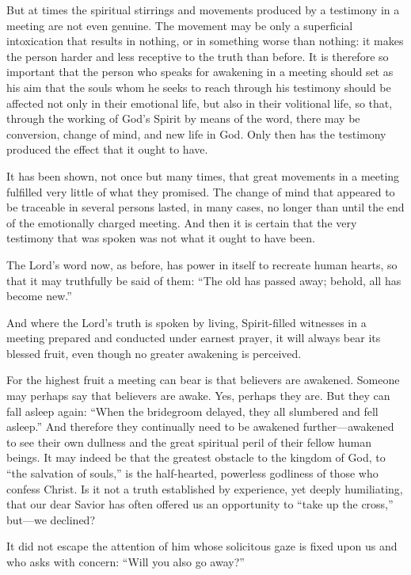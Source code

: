 But at times the spiritual stirrings and movements produced by a testimony in a meeting are not even genuine. The movement may be only a superficial intoxication that results in nothing, or in something worse than nothing: it makes the person harder and less receptive to the truth than before. It is therefore so important that the person who speaks for awakening in a meeting should set as his aim that the souls whom he seeks to reach through his testimony should be affected not only in their emotional life, but also in their volitional life, so that, through the working of God’s Spirit by means of the word, there may be conversion, change of mind, and new life in God. Only then has the testimony produced the effect that it ought to have.

It has been shown, not once but many times, that great movements in a meeting fulfilled very little of what they promised. The change of mind that appeared to be traceable in several persons lasted, in many cases, no longer than until the end of the emotionally charged meeting. And then it is certain that the very testimony that was spoken was not what it ought to have been.

The Lord’s word now, as before, has power in itself to recreate human hearts, so that it may truthfully be said of them: “The old has passed away; behold, all has become new.”

And where the Lord’s truth is spoken by living, Spirit-filled witnesses in a meeting prepared and conducted under earnest prayer, it will always bear its blessed fruit, even though no greater awakening is perceived.

For the highest fruit a meeting can bear is that believers are awakened. Someone may perhaps say that believers are awake. Yes, perhaps they are. But they can fall asleep again: “When the bridegroom delayed, they all slumbered and fell asleep.” And therefore they continually need to be awakened further—awakened to see their own dullness and the great spiritual peril of their fellow human beings. It may indeed be that the greatest obstacle to the kingdom of God, to “the salvation of souls,” is the half-hearted, powerless godliness of those who confess Christ. Is it not a truth established by experience, yet deeply humiliating, that our dear Savior has often offered us an opportunity to “take up the cross,” but—we declined?

It did not escape the attention of him whose solicitous gaze is fixed upon us and who asks with concern: “Will you also go away?”

